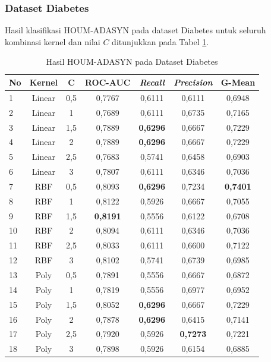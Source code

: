 \subsubsection{Dataset Diabetes} \label{IV.ADASYN_Diabetes}
Hasil klasifikasi HOUM-ADASYN pada dataset Diabetes untuk seluruh kombinasi kernel dan nilai $C$ ditunjukkan pada Tabel \ref{table:4.adasyn_diabetes}.

\begin{table}[H]
\centering
\caption{Hasil HOUM-ADASYN pada Dataset Diabetes}
\label{table:4.adasyn_diabetes}
\footnotesize
\begin{tabular}{|l|c|c|c|c|c|c|}
\hline
\textbf{No} & \textbf{Kernel} & \textbf{C} & \textbf{ROC-AUC} & \textbf{\textit{Recall}} & \textbf{\textit{Precision}} & \textbf{G-Mean} \\
\hline
1 & Linear & 0,5 & 0,7767 & 0,6111 & 0,6111 & 0,6948 \\
\hline
2 & Linear & 1 & 0,7689 & 0,6111 & 0,6735 & 0,7165 \\
\hline
3 & Linear & 1,5 & 0,7889 & \textbf{0,6296} & 0,6667 & 0,7229 \\
\hline
4 & Linear & 2 & 0,7889 & \textbf{0,6296} & 0,6667 & 0,7229 \\
\hline
5 & Linear & 2,5 & 0,7683 & 0,5741 & 0,6458 & 0,6903 \\
\hline
6 & Linear & 3 & 0,7807 & 0,6111 & 0,6346 & 0,7036 \\
\hline
7 & RBF & 0,5 & 0,8093 & \textbf{0,6296} & 0,7234 & \textbf{0,7401} \\
\hline
8 & RBF & 1 & 0,8122 & 0,5926 & 0,6667 & 0,7055 \\
\hline
9 & RBF & 1,5 & \textbf{0,8191} & 0,5556 & 0,6122 & 0,6708 \\
\hline
10 & RBF & 2 & 0,8094 & 0,6111 & 0,6346 & 0,7036 \\
\hline
11 & RBF & 2,5 & 0,8033 & 0,6111 & 0,6600 & 0,7122 \\
\hline
12 & RBF & 3 & 0,8102 & 0,5741 & 0,6739 & 0,6985 \\
\hline
13 & Poly & 0,5 & 0,7891 & 0,5556 & 0,6667 & 0,6872 \\
\hline
14 & Poly & 1 & 0,7819 & 0,5556 & 0,6977 & 0,6952 \\
\hline
15 & Poly & 1,5 & 0,8052 & \textbf{0,6296} & 0,6667 & 0,7229 \\
\hline
16 & Poly & 2 & 0,7878 & \textbf{0,6296} & 0,6415 & 0,7141 \\
\hline
17 & Poly & 2,5 & 0,7920 & 0,5926 & \textbf{0,7273} & 0,7221 \\
\hline
18 & Poly & 3 & 0,7898 & 0,5926 & 0,6154 & 0,6885 \\
\hline
\end{tabular}
\end{table}

